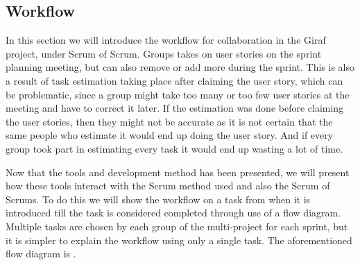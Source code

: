 \subsection*{Workflow}
In this section we will introduce the workflow for collaboration in the Giraf project, under Scrum of Scrum. 
Groups takes on user stories on the sprint planning meeting, but can also remove or add more during the sprint.
This is also a result of task estimation taking place after claiming the user story, which can be problematic, since a group might take too many or too few user stories at the meeting and have to correct it later. 
If the estimation was done before claiming the user stories, then they might not be accurate as it is not certain that the same people who estimate it would end up doing the user story.
And if every group took part in estimating every task it would end up wasting a lot of time. 


Now that the tools and development method has been presented, we will present how these tools interact with the Scrum method used and also the Scrum of Scrums. 
To do this we will show the workflow on a task from when it is introduced till the task is considered completed through use of a flow diagram.
Multiple tasks are chosen by each group of the multi-project for each sprint, but it is simpler to explain the workflow using only a single task. 
The aforementioned flow diagram is . 

